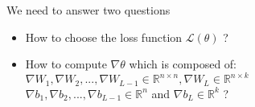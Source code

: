 \savestack{\nnfruitclassexample}{}
\savestack{\nnimdbexample}{}
\savestack{\nn}{}


\begin{frame}
\end{frame}

\begin{frame}
  \begin{block}{We need to answer two questions}
    \begin{itemize}
      \justifying
      \item \alert<2>{How to choose the loss function $\mathscr{L}(\theta)$ ?} \color{black}
      \item How to compute $\nabla \theta$ which is composed of:\\
      $\nabla W_1, \nabla W_2, ..., \nabla W_{L-1} \in \mathbb{R}^{n \times n}, \nabla W_L \in \mathbb{R}^{n \times k}$\\
      $\nabla b_1, \nabla b_2, ..., \nabla b_{L-1} \in \mathbb{R}^n $ and $\nabla b_L \in \mathbb{R}^k$ ?
    \end{itemize}
  \end{block}
\end{frame}

